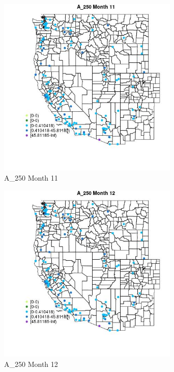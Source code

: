 \begin{figure} 
\centering  
\includegraphics[width=0.77\textwidth]{Code_Outputs/Report_ML_input_PM25_Step4_part_e_de_duplicated_aves_MapObsMo11A_250.jpg} 
\caption{\label{fig:Report_ML_input_PM25_Step4_part_e_de_duplicated_avesMapObsMo11A_250}A_250 Month 11} 
\end{figure} 
 

\clearpage 

\begin{figure} 
\centering  
\includegraphics[width=0.77\textwidth]{Code_Outputs/Report_ML_input_PM25_Step4_part_e_de_duplicated_aves_MapObsMo12A_250.jpg} 
\caption{\label{fig:Report_ML_input_PM25_Step4_part_e_de_duplicated_avesMapObsMo12A_250}A_250 Month 12} 
\end{figure} 
 

